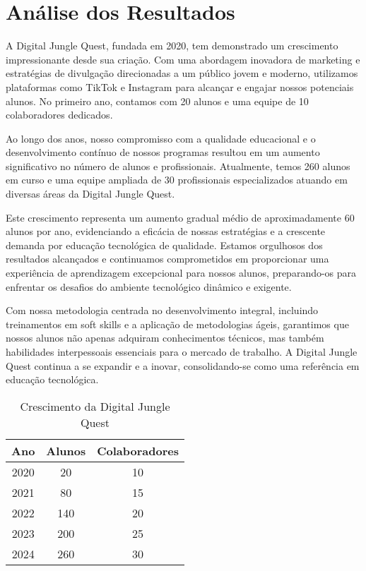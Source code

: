 \chapter{Análise dos Resultados}
\label{ch:resultados}
A Digital Jungle Quest, fundada em 2020, tem demonstrado um crescimento impressionante desde sua criação. Com uma abordagem inovadora de marketing e estratégias de divulgação direcionadas a um público jovem e moderno, utilizamos plataformas como TikTok e Instagram para alcançar e engajar nossos potenciais alunos. No primeiro ano, contamos com 20 alunos e uma equipe de 10 colaboradores dedicados.

Ao longo dos anos, nosso compromisso com a qualidade educacional e o desenvolvimento contínuo de nossos programas resultou em um aumento significativo no número de alunos e profissionais. Atualmente, temos 260 alunos em curso e uma equipe ampliada de 30 profissionais especializados atuando em diversas áreas da Digital Jungle Quest.

Este crescimento representa um aumento gradual médio de aproximadamente 60 alunos por ano, evidenciando a eficácia de nossas estratégias e a crescente demanda por educação tecnológica de qualidade. Estamos orgulhosos dos resultados alcançados e continuamos comprometidos em proporcionar uma experiência de aprendizagem excepcional para nossos alunos, preparando-os para enfrentar os desafios do ambiente tecnológico dinâmico e exigente.

Com nossa metodologia centrada no desenvolvimento integral, incluindo treinamentos em soft skills e a aplicação de metodologias ágeis, garantimos que nossos alunos não apenas adquiram conhecimentos técnicos, mas também habilidades interpessoais essenciais para o mercado de trabalho. A Digital Jungle Quest continua a se expandir e a inovar, consolidando-se como uma referência em educação tecnológica.

\begin{table}[!ht]
    \centering
    \caption{Crescimento da Digital Jungle Quest}
    \label{tab:crescimento}
    \begin{tabular*}{\columnwidth}{@{\extracolsep{\fill}}ccc@{}}
        \toprule[1pt] \textbf{Ano} & \textbf{Alunos} & \textbf{Colaboradores}\\ \midrule
        2020 & 20 & 10 \\
        2021 & 80 & 15 \\
        2022 & 140 & 20 \\
        2023 & 200 & 25 \\
        2024 & 260 & 30 \\
        \bottomrule[1pt]
    \end{tabular*}
\end{table}
